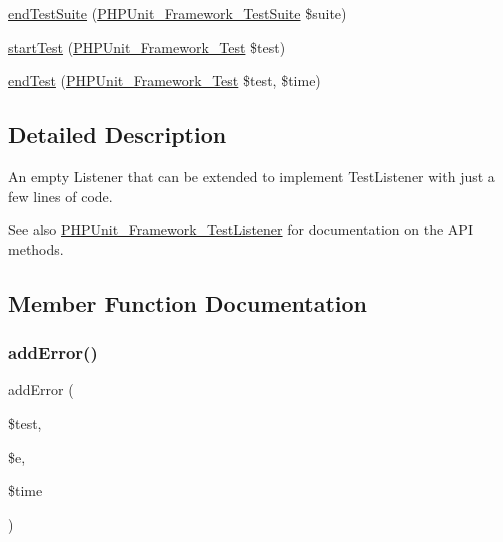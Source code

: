 \begin{DoxyCompactItemize}
\mbox{\hyperlink{class_p_h_p_unit___framework___base_test_listener_aeec28a4d1328434916ebcdc1ca6b5527}{end\+Test\+Suite}} (\mbox{\hyperlink{class_p_h_p_unit___framework___test_suite}{P\+H\+P\+Unit\+\_\+\+Framework\+\_\+\+Test\+Suite}} \$suite)
\item 
\mbox{\hyperlink{class_p_h_p_unit___framework___base_test_listener_a1a9bddc54f26bb3fb5c2ec9778ea5198}{start\+Test}} (\mbox{\hyperlink{interface_p_h_p_unit___framework___test}{P\+H\+P\+Unit\+\_\+\+Framework\+\_\+\+Test}} \$test)
\item 
\mbox{\hyperlink{class_p_h_p_unit___framework___base_test_listener_a6de65eea8b294795cbc34c4c8cee8546}{end\+Test}} (\mbox{\hyperlink{interface_p_h_p_unit___framework___test}{P\+H\+P\+Unit\+\_\+\+Framework\+\_\+\+Test}} \$test, \$time)
\end{DoxyCompactItemize}


\subsection{Detailed Description}
An empty Listener that can be extended to implement Test\+Listener with just a few lines of code.

\begin{DoxySeeAlso}{See also}
\mbox{\hyperlink{interface_p_h_p_unit___framework___test_listener}{P\+H\+P\+Unit\+\_\+\+Framework\+\_\+\+Test\+Listener}} for documentation on the A\+PI methods. 
\end{DoxySeeAlso}


\subsection{Member Function Documentation}
\mbox{\label{class_p_h_p_unit___framework___base_test_listener_a320d7bc7d2f9264ee7ba7aca6fd2df41}} 
\subsubsection{\texorpdfstring{add\+Error()}{addError()}}
{\footnotesize\ttfamily add\+Error (\begin{DoxyParamCaption}\item[{\mbox{\hyperlink{interface_p_h_p_unit___framework___test}{P\+H\+P\+Unit\+\_\+\+Framework\+\_\+\+Test}}}]{\$test,  }\item[{Exception}]{\$e,  }\item[{}]{\$time }\end{DoxyParamCaption})}

